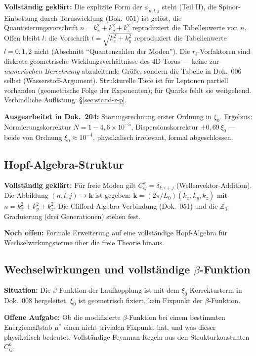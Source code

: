 \textbf{Vollständig geklärt:} Die explizite Form der $\phi_{n,l,j}$ steht
(Teil II), die Spinor-Einbettung durch Toruswicklung (Dok.~051) ist gelöst,
die Quantisierungsvorschrift $n = k_x^2+k_y^2+k_z^2$ reproduziert
die Tabellenwerte von $n$. Offen bleibt $l$: die Vorschrift
$l = \sqrt{k_x^2+k_y^2}$ reproduziert die Tabellenwerte $l = 0, 1, 2$
nicht (Abschnitt \enquote{Quantenzahlen der Moden}). Die $r_i$-Vorfaktoren
sind diskrete geometrische Wicklungsverhältnisse des 4D-Torus ---
keine zur \emph{numerischen Berechnung} abzuleitende Größe, sondern
die Tabelle in Dok.~006 selbst (Wasserstoff-Argument). Strukturelle
Tiefe ist für Leptonen partiell vorhanden (geometrische Folge der
Exponenten); für Quarks
fehlt sie weitgehend. Verbindliche Auflistung: §\ref{sec:stand-r-p}.

\textbf{Ausgearbeitet in Dok.~204:} Störungsrechnung erster Ordnung
in $\xi_0$. Ergebnis: Normierungskorrektur $N = 1-4{,}6\times10^{-5}$,
Dispersionskorrektur $+0{,}69\,\xi_0$ — beide von Ordnung
$\xi_0 \approx 10^{-4}$, physikalisch irrelevant, formal abgeschlossen.

\subsection{Hopf-Algebra-Struktur}

\textbf{Vollständig geklärt:} Für freie Moden gilt $C^k_{ij} = \delta_{k,i+j}$
(Wellenvektor-Addition). Die Abbildung $(n,l,j) \to \mathbf{k}$ ist
gegeben: $\mathbf{k} = (2\pi/L_0)(k_x,k_y,k_z)$ mit
$n = k_x^2+k_y^2+k_z^2$. Die Clifford-Algebra-Verbindung
(Dok.~051) und die $\mathbb{Z}_3$-Graduierung (drei Generationen)
stehen fest.

\textbf{Noch offen:} Formale Erweiterung auf eine vollständige
Hopf-Algebra für Wechselwirkungsterme über die freie Theorie hinaus.

\subsection{Wechselwirkungen und vollständige \texorpdfstring{$\beta$}{}-Funktion}

\textbf{Situation:} Die $\beta$-Funktion der Laufkopplung ist
mit dem $\xi_0$-Korrekturterm in Dok.~008 hergeleitet.
$\xi_0$ ist geometrisch fixiert, kein Fixpunkt der $\beta$-Funktion.

\textbf{Offene Aufgabe:} Ob die modifizierte $\beta$-Funktion bei
einem bestimmten Energiemaßstab $\mu^*$ einen nicht-trivialen Fixpunkt
hat, und was dieser physikalisch bedeutet. Vollständige Feynman-Regeln
aus den Strukturkonstanten $C^k_{ij}$.

